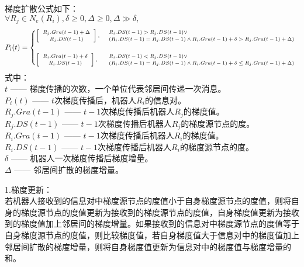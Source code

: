 梯度扩散公式如下：\\
${ \forall R_j \in N_e(R_i), \delta \geq 0, \Delta \geq 0, \Delta \gg \delta,}$ \\
\begin{equation}\scriptsize
	P_i(t) = 
	\begin{cases}
		\vspace{0.5cm}
		\left[
		\begin{array}{c}
			R_j.Gra(t-1) + \Delta \\
			R_j.DS(t-1)
		\end{array}
		\right], & 
		\begin{array}{l}
			R_i.DS(t-1) > R_j.DS(t-1) \vee \\
			(R_i.DS(t-1) = R_j.DS(t-1) \wedge R_i.Gra(t-1) +\delta > R_j.Gra(t-1) + \Delta)
		\end{array} \\
		
		\left[
		\begin{array}{c}
		R_i.Gra(t-1) + \delta \\
		R_i.DS(t-1)
		\end{array}
		\right], & 
		\begin{array}{l}
			R_i.DS(t-1) < R_j.DS(t-1) \vee \\
			(R_i.DS(t-1) = R_j.DS(t-1) \wedge R_i.Gra(t-1) +\delta \leq R_j.Gra(t-1) + \Delta)
		\end{array}		
	\end{cases} 
\end{equation}
式中：\\
\indent $t$ —— 梯度传播的次数，一个单位代表邻居间传递一次消息。\\
\indent $P_i(t)$ —— $t$次梯度传播后，机器人$R_i$的信息对。\\
\indent $R_j.Gra(t-1)$ —— $t-1$次梯度传播后机器人$R_j$的梯度值。\\
\indent $R_j.DS(t-1)$ —— $t-1$次梯度传播后机器人$R_j$的梯度源节点的度。\\
\indent $R_i.Gra(t-1)$ —— $t-1$次梯度传播后机器人$R_i$的梯度值。\\
\indent $R_i.DS(t-1)$ —— $t-1$次梯度传播后机器人$R_i$的梯度源节点的度。\\
\indent $\delta$ —— 机器人一次梯度传播后梯度增量。\\
\indent $\Delta$ —— 邻居间扩散的梯度增量。

1.梯度更新：\\
\indent 若机器人接收到的信息对中梯度源节点的度值小于自身梯度源节点的度值，则将自身的梯度源节点的度值更新为接收到的梯度源节点的度值，自身梯度值更新为接收到的梯度值加上邻居间的梯度增量。如果接收到的信息对中梯度源节点的度值等于自身梯度源节点的度值，则比较梯度值，若自身梯度值大于信息对中的梯度值加上邻居间扩散的梯度增量，则将自身梯度值更新为信息对中的梯度值与梯度增量的和。


